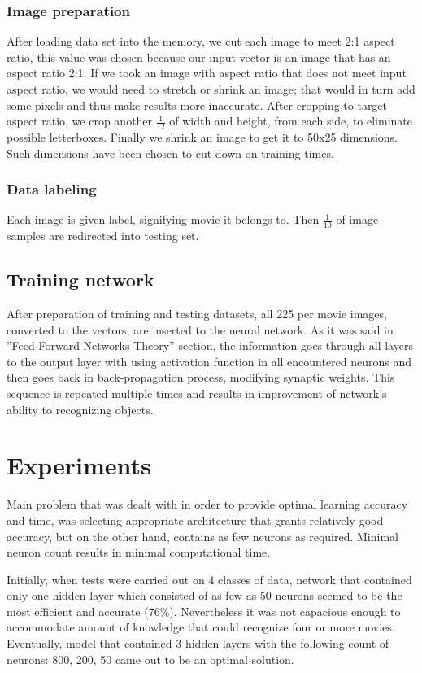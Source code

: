 \documentclass[conference]{IEEEtran}
\begin{document}
	\subsubsection{Image preparation} After loading data set into the memory, we cut each image to meet 2:1 aspect ratio, this value was chosen because our input vector is an image that has an aspect ratio 2:1. If we took an image with aspect ratio that does not meet input aspect ratio, we would need to stretch or shrink an image; that would in turn add some pixels and thus make results more inaccurate. After cropping to target aspect ratio, we crop another $\frac{1}{12}$ of width and height, from each side, to eliminate possible letterboxes. Finally we shrink an image to get it to 50x25 dimensions. Such dimensions have been chosen to cut down on training times.
	\subsubsection{Data labeling}
	Each image is given label, signifying movie it belongs to. Then $\frac{1}{10}$ of image samples are redirected into testing set.
	\subsection{Training network}
	After preparation of training and testing datasets, all 225 per movie images, converted to the vectors, are inserted to the neural network. As it was said in ''Feed-Forward Networks Theory'' section, the information goes through all layers to the output layer with using activation function in all encountered neurons and then goes back in back-propagation process, modifying synaptic weights. This sequence is repeated multiple times and results in improvement of network's ability to recognizing objects.

\section{Experiments}
	Main problem that was dealt with in order to provide optimal learning accuracy and time, was selecting appropriate architecture that grants relatively good accuracy, but on the other hand, contains as few neurons as required. Minimal neuron count results in minimal computational time.
	
	Initially, when tests were carried out on 4 classes of data, network that contained only one hidden layer which consisted of as few as 50 neurons seemed to be the most efficient and accurate (76\%). Nevertheless it was not capacious enough to accommodate amount of knowledge that could recognize four or more movies. Eventually, model that contained 3 hidden layers with the following count of neurons: 800, 200, 50 came out to be an optimal solution.
	
\end{document}
